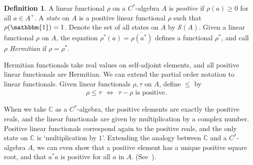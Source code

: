 \documentclass[11pt,a4paper]{report}
\theoremstyle{plain}
\theoremstyle{definition}
\newtheorem{defn}{Definition}
\newcommand{\1}{\mathbbm{1}}
\newcommand{\C}{\mathbb{C}}
\renewcommand{\S}{\mathscr{S}}
\renewcommand{\bar}{\overline}
\begin{document}
\begin{defn}
	A linear functional $\rho$ on a $C^\ast$-algebra $A$ is \emph{positive} if 
	$\rho(a)\geq 0$ for all $a\in A^+$. A \emph{state} on $A$ is a positive linear 
	functional $\rho$ such that $\rho(\1)=1$. Denote the set of all states on $A$ by 
	$\S(A)$. Given a linear functional $\rho$ on $A$, the equation $\rho^\ast(a) 
	=\bar{\rho(a^\ast)}$ defines a functional $\rho^\ast$, and call $\rho$ 
	\emph{Hermitian} if $\rho=\rho^\ast$.

\end{defn}
Hermitian functionals take real values on self-adjoint elements, and all 
positive linear functionals are Hermitian. We can extend the partial order 
notation to linear functionals. Given linear functionals $\rho,\tau$ on $A$, 
define $\leq$ by
\begin{align*}
	\rho \leq \tau ~~\iff~~ \tau - \rho \mbox{ is positive}.
\end{align*}

When we take $\C$ as a $C^\ast$-algebra, the positive elements are exactly the 
positive reals, and the linear functionals are given by multiplication by a 
complex number. Positive linear functionals correspond again to the positive 
reals, and the only state on $\C$ is `multiplication by $1$'.
Extending the analogy between $\C$ and a $C^\ast$-algebra $A$, we can even show 
that a positive element has a unique positive square root, and that $a^\ast a$ 
is positive for all $a$ in $A$. (See~\cite[4.2.5 and 4.2.6]{kadison83}).
\end{document}
